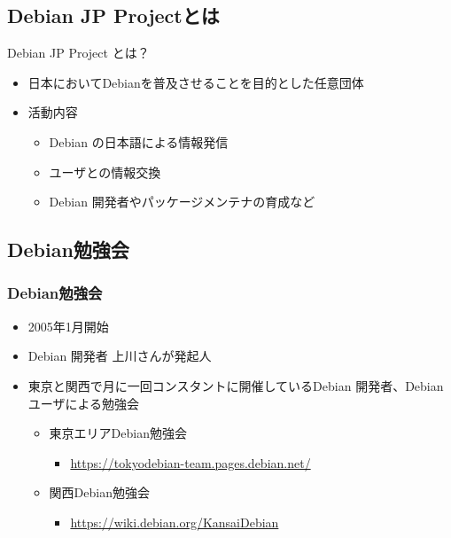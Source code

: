 \subsection{Debian JP Projectとは}
  
\begin{frame}{Debian JP Project とは？}

\begin{itemize}
  \item 日本においてDebianを普及させることを目的とした任意団体
  \item 活動内容
  \begin{itemize}
    \item Debian の日本語による情報発信
    \item ユーザとの情報交換
    \item Debian 開発者やパッケージメンテナの育成など
  \end{itemize}
\end{itemize}

\end{frame}

\subsection{Debian勉強会}

\begin{frame}
  
\frametitle{Debian勉強会}
\begin{itemize}
 \item 2005年1月開始
 \item Debian 開発者 上川さんが発起人
 \item 東京と関西で月に一回コンスタントに開催しているDebian 開発者、Debian ユーザによる勉強会
   \begin{itemize}
   \item 東京エリアDebian勉強会
     \begin{itemize}
     \item \url{https://tokyodebian-team.pages.debian.net/}
     \end{itemize}
   \item 関西Debian勉強会
     \begin{itemize}
     \item \url{https://wiki.debian.org/KansaiDebian}
     \end{itemize}
   \end{itemize}
\end{itemize}

\end{frame}



